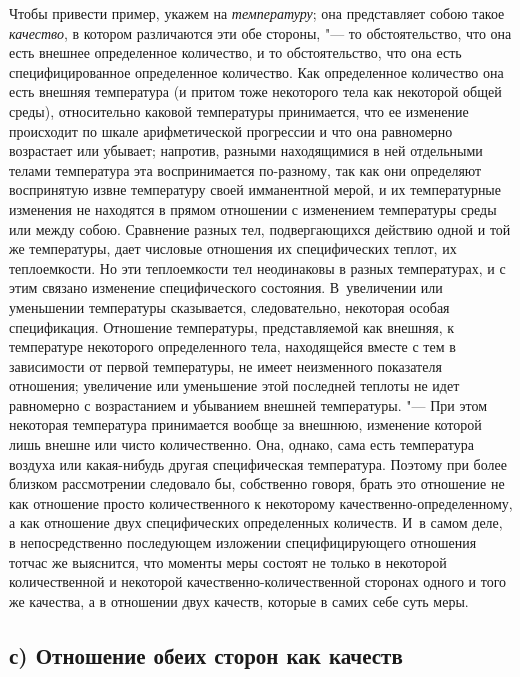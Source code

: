Чтобы привести пример, укажем на {\em температуру}; она
представляет собою такое {\em качество}, в котором
различаются эти обе стороны, "--- то обстоятельство, что она есть внешнее
определенное количество, и то обстоятельство, что она есть
специфицированное определенное количество. Как определенное количество она
есть внешняя температура (и притом тоже некоторого тела как некоторой общей
среды), относительно каковой температуры принимается, что ее изменение
происходит по шкале арифметической прогрессии и что она равномерно
возрастает или убывает; напротив, разными находящимися в ней отдельными
телами температура эта воспринимается по-разному, так как они определяют
воспринятую извне температуру своей имманентной мерой, и их температурные
изменения не находятся в прямом отношении с изменением температуры среды
или между собою. Сравнение разных тел, подвергающихся действию одной и той
же температуры, дает числовые отношения их специфических теплот, их
теплоемкости. Но эти теплоемкости тел неодинаковы в разных температурах, и
с этим связано изменение специфического состояния. В~увеличении или
уменьшении температуры сказывается, следовательно, некоторая особая
спецификация. Отношение температуры, представляемой как внешняя, к
температуре некоторого определенного тела, находящейся вместе с тем в
зависимости от первой температуры, не имеет неизменного показателя
отношения; увеличение или уменьшение этой последней теплоты не идет
равномерно с возрастанием и убыванием внешней температуры. "--- При этом
некоторая температура принимается вообще за внешнюю, изменение которой лишь
внешне или чисто количественно. Она, однако, сама есть температура воздуха
или какая-нибудь другая специфическая температура. Поэтому при более
близком рассмотрении следовало бы, собственно говоря, брать это отношение
не как отношение просто количественного к некоторому
качественно-определенному, а как отношение двух специфических определенных
количеств. И~в самом деле, в непосредственно последующем изложении
специфицирующего отношения тотчас же выяснится, что моменты меры состоят не
только в некоторой количественной и некоторой качественно-количественной
сторонах одного и того же качества, а в отношении двух качеств, которые в
самих себе суть меры.


\subsection[с) Отношение обеих сторон как качеств]{с) Отношение обеих
сторон как качеств}

